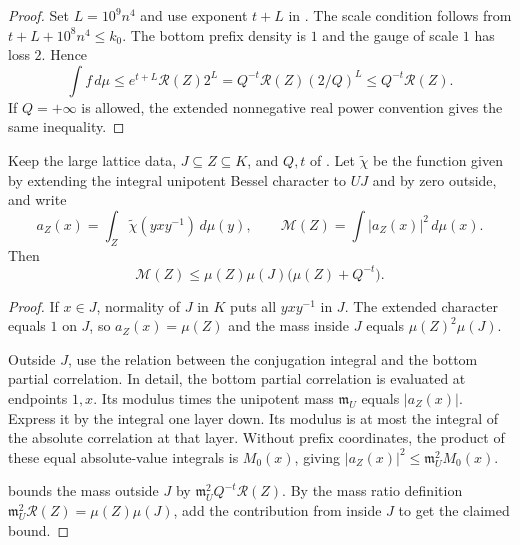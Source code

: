 \begin{proof}
Set $L=10^9 n^4$ and use exponent $t+L$ in .
The scale condition follows from $t+L+10^8 n^4\le k_0$.
The bottom prefix density is $1$ and the gauge of scale $1$ has loss $2$. Hence
\[
 \int f\,d\mu
 \le e^{t+L}\mathcal R(Z)2^L
 =Q^{-t}\mathcal R(Z)(2/Q)^L
 \le Q^{-t}\mathcal R(Z).
\]
If $Q=+\infty$ is allowed, the extended nonnegative real power convention gives
the same inequality.
\end{proof}

\begin{lemma}
\label{lem:b-local-mass}
\emitthmsource
Keep the large lattice data, $J\subseteq Z\subseteq K$, and $Q,t$ of .
Let $\widetilde\chi$ be the function given by extending the integral unipotent Bessel character to $U J$ and by zero outside, and write
\[
 a_Z(x)=\int_Z\widetilde\chi(yxy^{-1})\,d\mu(y),
 \qquad
 \mathcal M(Z)=\int |a_Z(x)|^2\,d\mu(x).
\]
Then
\[
 \mathcal M(Z)\le\mu(Z)\mu(J)\bigl(\mu(Z)+Q^{-t}\bigr).
\]
\end{lemma}
\begin{proof}
If $x\in J$, normality of $J$ in $K$ puts all $yxy^{-1}$ in $J$.
The extended character equals $1$ on $J$, so $a_Z(x)=\mu(Z)$ and the mass inside $J$ equals $\mu(Z)^2\mu(J)$.

Outside $J$, use the relation between the conjugation integral and the bottom partial correlation.
In detail, the bottom partial correlation is evaluated at endpoints $1,x$. Its modulus times the unipotent mass $\mathfrak m_U$
equals $|a_Z(x)|$. Express it by the integral one layer down.
Its modulus is at most the integral of the absolute correlation at that layer.
Without prefix coordinates, the product of these equal absolute-value integrals is $M_0(x)$,
giving $|a_Z(x)|^2\le\mathfrak m_U^2M_0(x)$.

 bounds the mass outside $J$ by
$\mathfrak m_U^2 Q^{-t}\mathcal R(Z)$.
By the mass ratio definition $\mathfrak m_U^2\mathcal R(Z)=\mu(Z)\mu(J)$,
add the contribution from inside $J$ to get the claimed bound.
\end{proof}

